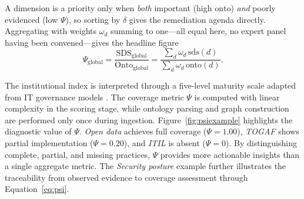 \documentclass[engproc,proceedingpaper,submit,moreauthors]{Definitions/mdpi}
\begin{document}
    A dimension is a priority only when \emph{both} important (high $\mathrm{onto}$) \emph{and} poorly evidenced (low $\Psi$), so sorting by $\delta$ gives the remediation agenda directly. Aggregating with weights $\omega_d$ summing to one---all equal here, no expert panel having been convened---gives the headline figure
\begin{equation}
\Psi_{\mathrm{global}}=\frac{\mathrm{SDS}_{\mathrm{global}}}{\mathrm{Onto}_{\mathrm{global}}}=\frac{\sum_d \omega_d\,\mathrm{sds}(d)}{\sum_d \omega_d\,\mathrm{onto}(d)}.
\label{eq:global}
\end{equation} 

    
    
    The institutional index is interpreted through a five-level maturity scale adapted from IT governance models \cite{DeHaes2013}. The coverage metric $\Psi$ is computed with linear complexity in the scoring stage, while ontology parsing and graph construction are performed only once during ingestion. Figure~\ref{fig:psiexample} highlights the diagnostic value of $\Psi$. \emph{Open data} achieves full coverage ($\Psi=1.00$), \emph{TOGAF} shows partial implementation ($\Psi=0.20$), and \emph{ITIL} is absent ($\Psi=0$). By distinguishing complete, partial, and missing practices, $\Psi$ provides more actionable insights than a single aggregate metric. The \emph{Security posture} example further illustrates the traceability from observed evidence to coverage assessment through Equation~\eqref{eq:psi}.
\end{document}

